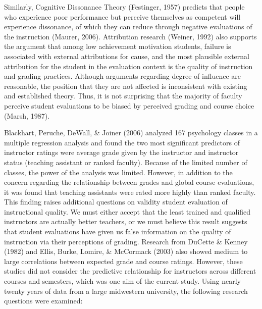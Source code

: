 \documentclass[man]{apa6}
\theoremstyle{definition}
\theoremstyle{definition}
\theoremstyle{definition}
\theoremstyle{remark}
\begin{document}
Similarly, Cognitive Dissonance Theory (Festinger, 1957) predicts that
people who experience poor performance but perceive themselves as
competent will experience dissonance, of which they can reduce through
negative evaluations of the instruction (Maurer, 2006). Attribution
research (Weiner, 1992) also supports the argument that among low
achievement motivation students, failure is associated with external
attributions for cause, and the most plausible external attribution for
the student in the evaluation context is the quality of instruction and
grading practices. Although arguments regarding degree of influence are
reasonable, the position that they are not affected is inconsistent with
existing and established theory. Thus, it is not surprising that the
majority of faculty perceive student evaluations to be biased by
perceived grading and course choice (Marsh, 1987).

Blackhart, Peruche, DeWall, \& Joiner (2006) analyzed 167 psychology
classes in a multiple regression analysis and found the two most
significant predictors of instructor ratings were average grade given by
the instructor and instructor status (teaching assistant or ranked
faculty). Because of the limited number of classes, the power of the
analysis was limited. However, in addition to the concern regarding the
relationship between grades and global course evaluations, it was found
that teaching assistants were rated more highly than ranked faculty.
This finding raises additional questions on validity student evaluation
of instructional quality. We must either accept that the least trained
and qualified instructors are actually better teachers, or we must
believe this result suggests that student evaluations have given us
false information on the quality of instruction via their perceptions of
grading. Research from DuCette \& Kenney (1982) and Ellis, Burke,
Lomire, \& McCormack (2003) also showed medium to large correlations
between expected grade and course ratings. However, these studies did
not consider the predictive relationship for instructors across
different courses and semesters, which was one aim of the current study.
Using nearly twenty years of data from a large midwestern university,
the following research questions were examined:
\end{document}
